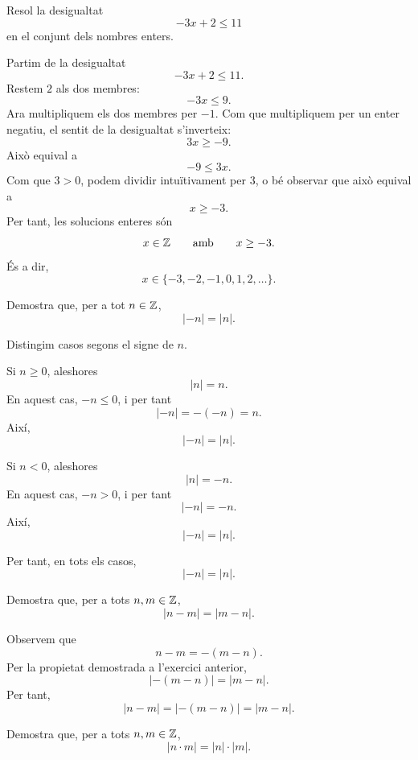 \begin{exercici}
Resol la desigualtat
\[
-3x+2\leq 11
\]
en el conjunt dels nombres enters.
\end{exercici}

\begin{solucio}
Partim de la desigualtat
\[
-3x+2\leq 11.
\]
Restem $2$ als dos membres:
\[
-3x\leq 9.
\]
Ara multipliquem els dos membres per $-1$. Com que multipliquem per un enter negatiu, el sentit de la desigualtat s'inverteix:
\[
3x\geq -9.
\]
Això equival a
\[
-9\leq 3x.
\]
Com que $3>0$, podem dividir intuïtivament per $3$, o bé observar que això equival a
\[
x\geq -3.
\]
Per tant, les solucions enteres són
\[
x\in\mathbb{Z}
\qquad\text{amb}\qquad
x\geq -3.
\]
És a dir,
\[
x\in\{-3,-2,-1,0,1,2,\ldots\}.
\]
\end{solucio}


\begin{exercici}
Demostra que, per a tot $n\in\mathbb{Z}$,
\[
|-n|=|n|.
\]
\end{exercici}

\begin{solucio}
Distingim casos segons el signe de $n$.

Si $n\geq 0$, aleshores
\[
|n|=n.
\]
En aquest cas, $-n\leq 0$, i per tant
\[
|-n|=-(-n)=n.
\]
Així,
\[
|-n|=|n|.
\]

Si $n<0$, aleshores
\[
|n|=-n.
\]
En aquest cas, $-n>0$, i per tant
\[
|-n|=-n.
\]
Així,
\[
|-n|=|n|.
\]

Per tant, en tots els casos,
\[
|-n|=|n|.
\]
\end{solucio}


\begin{exercici}
Demostra que, per a tots $n,m\in\mathbb{Z}$,
\[
|n-m|=|m-n|.
\]
\end{exercici}

\begin{solucio}
Observem que
\[
n-m=-(m-n).
\]
Per la propietat demostrada a l'exercici anterior,
\[
|-(m-n)|=|m-n|.
\]
Per tant,
\[
|n-m|=|-(m-n)|=|m-n|.
\]
\end{solucio}


\begin{exercici}
Demostra que, per a tots $n,m\in\mathbb{Z}$,
\[
|n\cdot m|=|n|\cdot |m|.
\]
\end{exercici}

